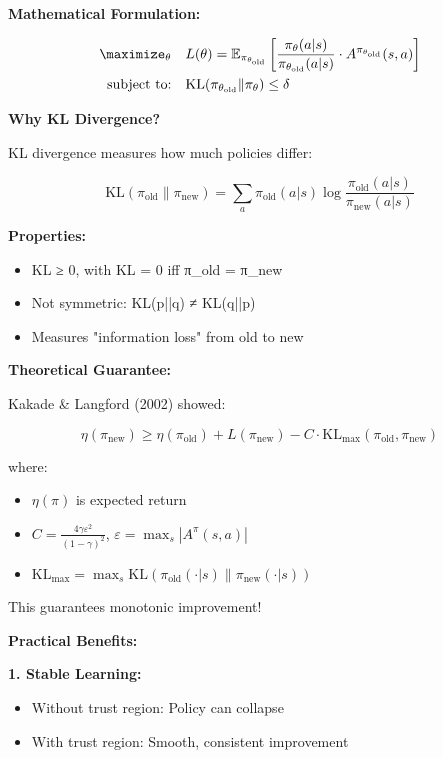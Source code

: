 \documentclass[12pt]{article}
\begin{document}
{{\textbf{Mathematical Formulation:}

\begin{align}
\maximize_\theta \quad & L(\theta) = \mathbb{E}_{\pi_{\theta_{\text{old}}}} \left[\frac{\pi_\theta(a|s)}{\pi_{\theta_{\text{old}}}(a|s)} \cdot A^{\pi_{\theta_{\text{old}}}}(s,a)\right] \\
\text{subject to:} \quad & \text{KL}(\pi_{\theta_{\text{old}}} \| \pi_\theta) \leq \delta
\end{align}

\textbf{Why KL Divergence?}

KL divergence measures how much policies differ:

\begin{equation}
\text{KL}(\pi_{\text{old}} \| \pi_{\text{new}}) = \sum_a \pi_{\text{old}}(a|s) \log\frac{\pi_{\text{old}}(a|s)}{\pi_{\text{new}}(a|s)}
\end{equation}

\textbf{Properties:}
\begin{itemize}
\item KL ≥ 0, with KL = 0 iff π_old = π_new
\item Not symmetric: KL(p||q) ≠ KL(q||p)
\item Measures "information loss" from old to new
\end{itemize}

\textbf{Theoretical Guarantee:}

Kakade \& Langford (2002) showed:

\begin{equation}
\eta(\pi_{\text{new}}) \geq \eta(\pi_{\text{old}}) + L(\pi_{\text{new}}) - C \cdot \text{KL}_{\max}(\pi_{\text{old}}, \pi_{\text{new}})
\end{equation}

where:
\begin{itemize}
\item $\eta(\pi)$ is expected return
\item $C = \frac{4\gamma\varepsilon^2}{(1-\gamma)^2}$, $\varepsilon = \max_s |A^\pi(s,a)|$
\item $\text{KL}_{\max} = \max_s \text{KL}(\pi_{\text{old}}(\cdot|s) \| \pi_{\text{new}}(\cdot|s))$
\end{itemize}

This guarantees monotonic improvement!

\textbf{Practical Benefits:}

\textbf{1. Stable Learning:}
\begin{itemize}
\item Without trust region: Policy can collapse
\item With trust region: Smooth, consistent improvement
\end{itemize}

}}
\end{document}
